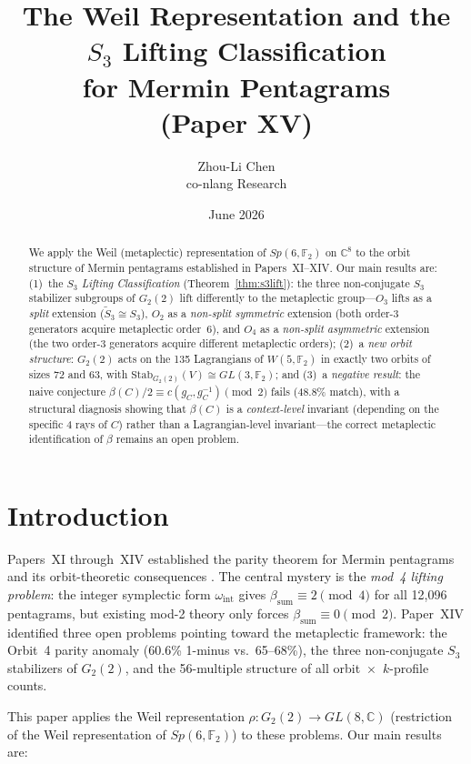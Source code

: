 \documentclass[11pt,a4paper]{article}
\title{The Weil Representation and the $S_3$ Lifting Classification\\
       for Mermin Pentagrams\\
       {\large (Paper XV)}}
\author{Zhou-Li Chen \\ co-nlang Research}
\date{June 2026}
\theoremstyle{remark}
\begin{document}
\maketitle

\begin{abstract}
We apply the Weil (metaplectic) representation of $Sp(6,\mathbb{F}_2)$ on
$\mathbb{C}^8$ to the orbit structure of Mermin pentagrams established in
Papers~XI--XIV.
Our main results are:
(1)~the \emph{$S_3$ Lifting Classification} (Theorem~\ref{thm:s3lift}):
the three non-conjugate $S_3$ stabilizer subgroups of $G_2(2)$ lift
differently to the metaplectic group---$O_3$ lifts as a \emph{split} extension
($\widetilde{S}_3 \cong S_3$), $O_2$ as a \emph{non-split symmetric} extension
(both order-3 generators acquire metaplectic order~6), and $O_4$ as a
\emph{non-split asymmetric} extension (the two order-3 generators acquire
different metaplectic orders);
(2)~a \emph{new orbit structure}: $G_2(2)$ acts on the 135 Lagrangians of
$W(5,\mathbb{F}_2)$ in exactly two orbits of sizes 72 and 63, with
$\mathrm{Stab}_{G_2(2)}(V) \cong GL(3,\mathbb{F}_2)$;
and (3)~a \emph{negative result}: the naive conjecture
$\beta(C)/2 \equiv c(g_C, g_C^{-1}) \pmod 2$ fails (48.8\% match),
with a structural diagnosis showing that $\beta(C)$ is a \emph{context-level}
invariant (depending on the specific 4 rays of $C$) rather than a
Lagrangian-level invariant---the correct metaplectic identification of
$\beta$ remains an open problem.
\end{abstract}


\section{Introduction}

Papers~XI through~XIV established the parity theorem for Mermin pentagrams
and its orbit-theoretic consequences \cite{PaperXI,PaperXII,PaperXIII,PaperXIV}.
The central mystery is the \emph{mod~4 lifting problem}: the integer symplectic
form $\omega_{\mathrm{int}}$ gives $\beta_{\mathrm{sum}} \equiv 2 \pmod 4$ for all
12{,}096 pentagrams, but existing mod-2 theory only forces $\beta_{\mathrm{sum}}
\equiv 0 \pmod 2$.
Paper~XIV identified three open problems pointing toward the metaplectic framework:
the Orbit~4 parity anomaly (60.6\% 1-minus vs.\ 65--68\%), the three non-conjugate
$S_3$ stabilizers of $G_2(2)$, and the 56-multiple structure of all
orbit~$\times$~$k$-profile counts.

This paper applies the Weil representation $\rho: G_2(2) \to GL(8,\mathbb{C})$
(restriction of the Weil representation of $Sp(6,\mathbb{F}_2)$) to these problems.
Our main results are:
\end{document}

